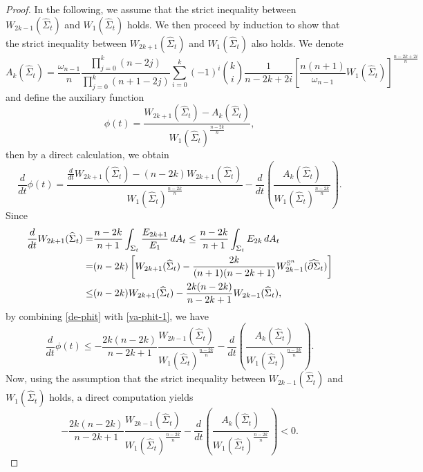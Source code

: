 \documentclass[11pt,reqno]{amsart}
\theoremstyle{definition}
\theoremstyle{remark}
\numberwithin{equation}{section}
\renewcommand{\(}{\left(}
\renewcommand{\)}{\right)}
\renewcommand{\-}{\overline}
\begin{document}
\begin{proof}
 In the following, we assume that the strict inequality between $W_{2k-1}(\widehat{\Sigma}_t)$ and $W_1(\widehat{\Sigma}_t)$ holds. We then proceed by induction to show that the strict inequality between $W_{2k+1}(\widehat{\Sigma}_t)$ and $W_1(\widehat{\Sigma}_t)$ also holds. We denote 
 \begin{equation}\label{Defn-Ak}
 	A_k(\widehat{\Sigma}_t)=\frac{\omega_{n-1}}{n}\frac{\prod_{j=0}^k(n-2j)}{\prod_{j=0}^k(n+1-2j)}\sum_{i=0}^k(-1)^i\binom{k}{i}\frac{1}{n-2k+2i}\left[\frac{n(n+1)}{\omega_{n-1}}W_1(\widehat{\Sigma}_t)\right]^{\frac{n-2k+2i}{n}}
 \end{equation}
  and define the auxiliary function 
 \begin{equation}\label{Defn-phi}
 	\phi(t)=\frac{W_{2k+1}(\widehat{\Sigma}_t)-A_k(\widehat{\Sigma}_t)}{W_1(\widehat{\Sigma}_t)^{\frac{n-2k}{n}}},
 \end{equation}
 then by a direct calculation, we obtain
 \begin{equation}\label{de-phit}
 	\frac{d}{dt}\phi(t)=\frac{\frac{d}{dt}W_{2k+1}(\widehat{\Sigma}_t)-(n-2k)W_{2k+1}(\widehat{\Sigma}_t)}{W_1(\widehat{\Sigma}_t)^{\frac{n-2k}{n}}}-\frac{d}{dt}\left(\frac{A_k(\widehat{\Sigma}_t)}{W_1(\widehat{\Sigma}_t)^{\frac{n-2k}{n}}}\right).
 \end{equation}
Since
\begin{align}
	\frac{d}{dt}W_{2k+1}(\widehat{\Sigma}_t)=&\frac{n-2k}{n+1}\int_{\Sigma_t}{\frac{E_{2k+1}}{E_1}}\,dA_t
	\leq\frac{n-2k}{n+1}\int_{\Sigma_t}{E_{2k}}\,dA_t\notag\\
	=&(n-2k)\left[W_{2k+1}(\widehat{\Sigma}_t)-\frac{2k}{(n+1)(n-2k+1)}W_{2k-1}^{\mathbb{S}^n}(\widehat{\partial\Sigma}_t)\right]\notag\\
	\leq&(n-2k)W_{2k+1}(\widehat{\Sigma}_t)-\frac{2k(n-2k)}{n-2k+1}W_{2k-1}(\widehat{\Sigma}_t), \label{va-phit-1}
\end{align}
by combining \eqref{de-phit} with \eqref{va-phit-1}, we have
\begin{equation}\label{va-phit-2}
	\frac{d}{dt}\phi(t)\leq -\frac{2k(n-2k)}{n-2k+1}\frac{W_{2k-1}(\widehat{\Sigma}_t)}{W_1(\widehat{\Sigma}_t)^{\frac{n-2k}{n}}}-\frac{d}{dt}\left(\frac{A_k(\widehat{\Sigma}_t)}{W_1(\widehat{\Sigma}_t)^{\frac{n-2k}{n}}}\right).
\end{equation}
Now, using the assumption that the strict inequality between $W_{2k-1}(\widehat{\Sigma}_t)$ and $W_1(\widehat{\Sigma}_t)$ holds,  a direct computation yields
\begin{equation*}
	-\frac{2k(n-2k)}{n-2k+1}\frac{W_{2k-1}(\widehat{\Sigma}_t)}{W_1(\widehat{\Sigma}_t)^{\frac{n-2k}{n}}}-\frac{d}{dt}\left(\frac{A_k(\widehat{\Sigma}_t)}{W_1(\widehat{\Sigma}_t)^{\frac{n-2k}{n}}}\right)<0.

\end{equation*}
\end{proof}
\end{document}
